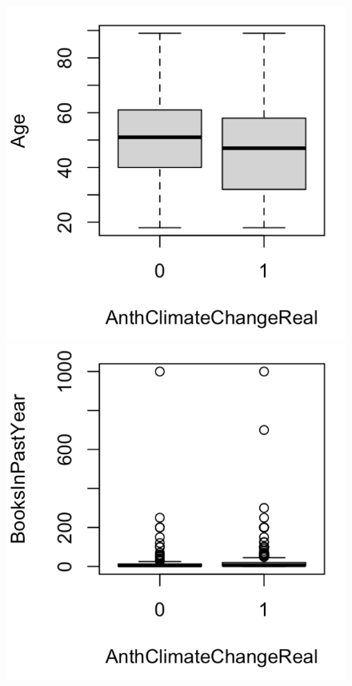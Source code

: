\begin{figure}[h]
    \centering
    \includegraphics[scale=.45]{boxplot_age_anth.png}
    \includegraphics[scale=.45]{boxplot_books_anth.png}

\end{figure}
